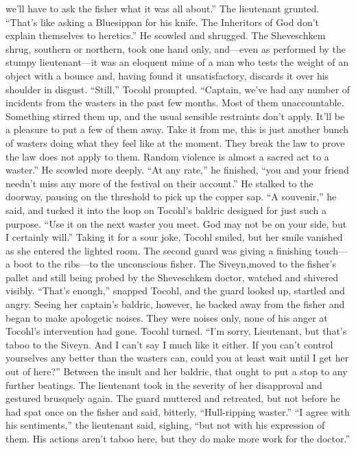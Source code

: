 \documentclass[9pt]{article}
\begin{document}
we’ll have to ask the fisher what it was all about.”
The lieutenant grunted. “That’s like asking a Bluesippan for his knife. The Inheritors of God don’t
explain themselves to heretics.” He scowled and shrugged.
The Sheveschkem shrug, southern or northern, took one hand only, and—even as performed by the
stumpy lieutenant—it was an eloquent mime of a man who tests the weight of an object with a bounce
and, having found it unsatisfactory, discards it over his shoulder in disgust.
“Still,” Tocohl prompted.
“Captain, we’ve had any number of incidents from the wasters in the past few months. Most of them
unaccountable. Something stirred them up, and the usual sensible restraints don’t apply. It’ll be a pleasure
to put a few of them away. Take it from me, this is just another bunch of wasters doing what they feel like
at the moment. They break the law to prove the law does not apply to them. Random violence is almost
a sacred act to a waster.” He scowled more deeply.
“At any rate,” he finished, “you and your friend needn’t miss any more of the festival on their
account.”
He stalked to the doorway, pausing on the threshold to pick up the copper sap. “A souvenir,” he
said, and tucked it into the loop on Tocohl’s baldric designed for just such a purpose. “Use it on the next
waster you meet. God may not be on your side, but I certainly will.”
Taking it for a sour joke, Tocohl smiled, but her smile vanished as she entered the lighted room. The
second guard was giving a finishing touch—a boot to the ribs—to the unconscious fisher. The Siveyn,moved to the fisher’s pallet and still being probed by the Sheveschkem doctor, watched and shivered
visibly.
“That’s enough,” snapped Tocohl, and the guard looked up, startled and angry. Seeing her captain’s
baldric, however, he backed away from the fisher and began to make apologetic noises. They were
noises only, none of his anger at Tocohl’s intervention had gone.
Tocohl turned. “I’m sorry, Lieutenant, but that’s taboo to the Siveyn. And I can’t say I much like it
either. If you can’t control yourselves any better than the wasters can, could you at least wait until I get
her out of here?” Between the insult and her baldric, that ought to put a stop to any further beatings.
The lieutenant took in the severity of her disapproval and gestured brusquely again. The guard
muttered and retreated, but not before he had spat once on the fisher and said, bitterly, “Hull-ripping
waster.”
“I agree with his sentiments,” the lieutenant said, sighing, “but not with his expression of them. His
actions aren’t taboo here, but they do make more work for the doctor.”
\end{document}
